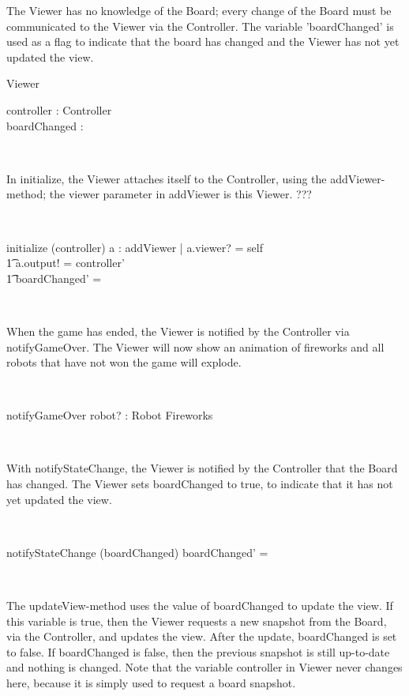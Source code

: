 The Viewer has no knowledge of the Board; every change of the Board must be communicated to the Viewer via the Controller. The variable 'boardChanged' is used as a flag to indicate that the board has changed and the Viewer has not yet updated the view.
\begin{class}{Viewer}
\begin{state}
controller : Controller \\
boardChanged : \bool
\end{state}\\
\begin{classcom}
In initialize, the Viewer attaches itself to the Controller, using the addViewer-method; the viewer parameter in addViewer is this Viewer. ???
\end{classcom} \\
\begin{schema}{initialize}
\Delta (controller)
\where
\exists a : addViewer | a.viewer? = self \implies \\ \t1
a.output! = controller' \\ \t1
boardChanged' = \false
\end{schema}\\
\begin{classcom}
When the game has ended, the Viewer is notified by the Controller via notifyGameOver. The Viewer will now show an animation of fireworks and all robots that have not won the game will explode.
\end{classcom} \\
\begin{schema}{notifyGameOver}
robot? : Robot
\where
Fireworks
\end{schema}\\
\begin{classcom}
With notifyStateChange, the Viewer is notified by the Controller that the Board has changed. The Viewer sets boardChanged to true, to indicate that it has not yet updated the view.
\end{classcom} \\
\begin{schema}{notifyStateChange}
\Delta (boardChanged)
\where
boardChanged' = \true
\end{schema}\\
\znewpage
\begin{classcom}
The updateView-method uses the value of boardChanged to update the view. If this variable is true, then the Viewer requests a new snapshot from the Board, via the Controller, and updates the view. After the update, boardChanged is set to false. If boardChanged is false, then the previous snapshot is still up-to-date and nothing is changed. Note that the variable controller in Viewer never changes here, because it is simply used to request a board snapshot.

\end{classcom}
\end{class}
